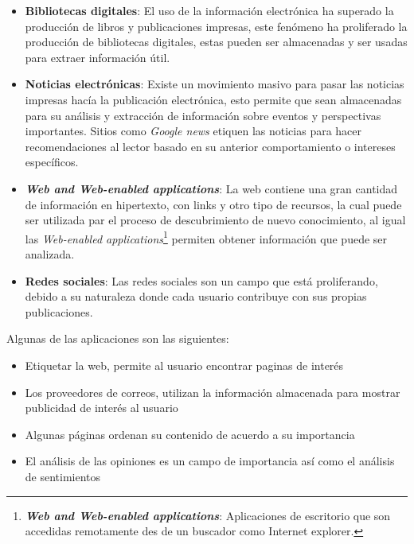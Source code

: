 \begin{itemize}

	\item \textbf{Bibliotecas digitales}: El uso de la información electrónica ha superado la producción de libros y publicaciones impresas, este fenómeno ha proliferado la producción de bibliotecas digitales, estas pueden ser almacenadas y ser usadas para extraer información útil.

	\item \textbf{Noticias electrónicas}: Existe un movimiento masivo para pasar las noticias impresas hacía la publicación electrónica, esto permite que sean almacenadas para su análisis y extracción de información sobre eventos y perspectivas importantes. Sitios como \textit{Google news} etiquen las noticias para hacer recomendaciones al lector basado en su anterior comportamiento o intereses específicos.

	\item \textbf{\textit{Web and Web-enabled applications}}: La web contiene una gran cantidad de información en hipertexto, con links y otro tipo de recursos, la cual puede ser utilizada par el proceso de descubrimiento de nuevo conocimiento, al igual las \textit{Web-enabled applications}\footnote{\textbf{\textit{Web and Web-enabled applications}}: Aplicaciones de escritorio que son  accedidas remotamente des de un buscador como Internet explorer.} permiten obtener información que puede ser analizada.

	\item \textbf{Redes sociales}: Las redes sociales son un campo que está proliferando, debido a su naturaleza donde cada usuario contribuye con sus propias publicaciones.

\end{itemize}



Algunas de las aplicaciones son las siguientes:

\begin{itemize}

	\item Etiquetar la web, permite al usuario encontrar paginas de interés

	\item Los proveedores de correos, utilizan la información almacenada para mostrar publicidad de interés al usuario

	\item Algunas páginas ordenan su contenido de acuerdo a su importancia

	\item El análisis de las opiniones es un campo de importancia así como el análisis de sentimientos		

\end{itemize}


